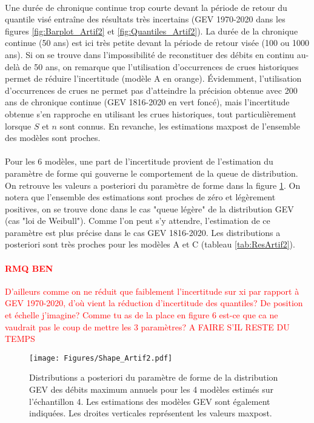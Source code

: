 \documentclass[11pt]{article}
\begin{document}
	\paragraph{} Une durée de chronique continue trop courte devant la période de retour du quantile visé entraîne des résultats très incertains (GEV 1970-2020 dans les figures \ref{fig:Barplot_Artif2} et \ref{fig:Quantiles_Artif2}). La durée de la chronique continue (50 ans) est ici très petite devant la période de retour visée (100 ou 1000 ans). Si on se trouve dans l'impossibilité de reconstituer des débits en continu au-delà de 50 ans, on remarque que l'utilisation d'occurrences de crues historiques permet de réduire l'incertitude (modèle A en orange). Évidemment, l'utilisation d'occurrences de crues ne permet pas d'atteindre la précision obtenue avec 200 ans de chronique continue (GEV 1816-2020 en vert foncé), mais l'incertitude obtenue s'en rapproche en utilisant les crues historiques, tout particulièrement lorsque $S$ et $n$ sont connus. En revanche, les estimations maxpost de l'ensemble des modèles sont proches. 
	
	\paragraph{} Pour les 6 modèles, une part de l'incertitude provient de l'estimation du paramètre de forme qui gouverne le comportement de la queue de distribution. On retrouve les valeurs a posteriori du paramètre de forme dans la figure \ref{fig:Shape_Artif2}. On notera que l'ensemble des estimations sont proches de zéro et légèrement positives, on se trouve donc dans le cas "queue légère" de la distribution GEV (cas "loi de Weibull"). Comme l'on peut s'y attendre, l'estimation de ce paramètre est plus précise dans le cas GEV 1816-2020. Les distributions a posteriori sont très proches pour les modèles A et C (tableau \ref{tab:ResArtif2}). 
	
	\textcolor{red}{
	\paragraph{RMQ BEN} D'ailleurs comme on ne réduit que faiblement l'incertitude sur xi par rapport à GEV 1970-2020, d'où vient la réduction d'incertitude des quantiles? De position et échelle j'imagine? Comme tu as de la place en figure 6 est-ce que ca ne vaudrait pas le coup de mettre les 3 paramètres? A FAIRE S'IL RESTE DU TEMPS
	}
	
	\begin{figure}[h]
		\centering
		\texttt{[image: Figures/Shape\_Artif2.pdf]}	
		\caption{Distributions a posteriori du paramètre de forme de la distribution GEV des débits maximum annuels pour les 4 modèles estimés sur l'échantillon 4. Les estimations des modèles GEV sont également indiquées. Les droites verticales représentent les valeurs maxpost.}
		\label{fig:Shape_Artif2}
	\end{figure}
\end{document}
